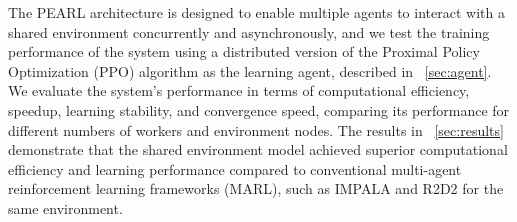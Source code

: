 The PEARL architecture is designed to enable multiple agents to interact with a shared environment concurrently and asynchronously,
and we test the training performance of the system using a distributed version of the Proximal Policy Optimization (PPO) algorithm
as the learning agent, described in ~\autoref{sec:agent}.
We evaluate the system's performance in terms of computational efficiency, speedup, learning stability, and convergence speed,
comparing its performance for different numbers of workers and environment nodes.
The results in ~\autoref{sec:results} demonstrate that the shared environment model
achieved superior computational efficiency and learning performance compared to
conventional multi-agent reinforcement learning frameworks (MARL), such as IMPALA and R2D2 for the same environment.
